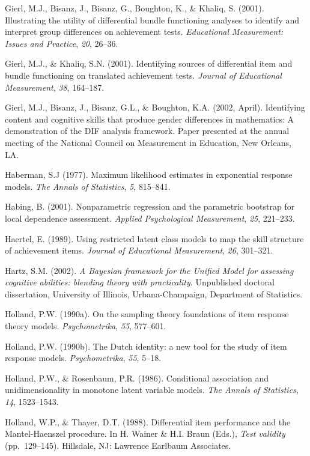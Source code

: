 \documentclass[titlepage,11pt,twoside]{article}
\begin{document}
\begin{thebibliography}
\bibitem Gierl, M.J., Bisanz, J., Bisanz, G., Boughton, K., \& Khaliq, S. (2001). Illustrating the utility of differential bundle functioning analyses to identify and interpret group differences on achievement tests. \textit{Educational Measurement: Issues and Practice}, \textit{20}, 26--36.

\bibitem Gierl, M.J., \& Khaliq, S.N. (2001). Identifying sources of differential item and bundle functioning on translated achievement tests. \textit{Journal of Educational Measurement}, \textit{38}, 164--187.

\bibitem Gierl, M.J., Bisanz, J., Bisanz, G.L., \& Boughton, K.A. (2002, April). Identifying content and cognitive skills that produce gender differences in mathematics: A demonstration of the DIF analysis framework. Paper presented at the annual meeting of the National Council on Measurement in Education, New Orleans, LA.

\bibitem Haberman, S.J (1977). Maximum likelihood estimates in exponential response models. \textit{The Annals of Statistics}, \textit{5}, 815--841.

\bibitem Habing, B. (2001). Nonparametric regression and the parametric bootstrap for local dependence assessment. \textit{Applied Psychological Measurement}, \textit{25}, 221--233.

\bibitem Haertel, E. (1989). Using restricted latent class models to map the skill structure of achievement items. \textit{Journal of Educational Measurement}, \textit{26}, 301--321.

\bibitem Hartz, S.M. (2002). \textit{A Bayesian framework for the Unified Model for assessing cognitive abilities: blending theory with practicality}. Unpublished doctoral dissertation, University of Illinois, Urbana-Champaign, Department of Statistics.

\bibitem Holland, P.W. (1990a). On the sampling theory foundations of item response theory models. \textit{Psychometrika}, \textit{55}, 577--601.

\bibitem Holland, P.W. (1990b). The Dutch identity: a new tool for the study of item response models. \textit{Psychometrika}, \textit{55}, 5--18.

\bibitem Holland, P.W., \& Rosenbaum, P.R. (1986). Conditional association and unidimensionality in monotone latent variable models. \textit{The Annals of Statistics}, \textit{14}, 1523--1543.

\bibitem Holland, W.P., \& Thayer, D.T. (1988). Differential item performance and the Mantel-Haenszel procedure. In H. Wainer \& H.I. Braun (Eds.), \textit{Test validity} (pp.~129--145). Hillsdale, NJ: Lawrence Earlbaum Associates.


\end{thebibliography}
\end{document}
